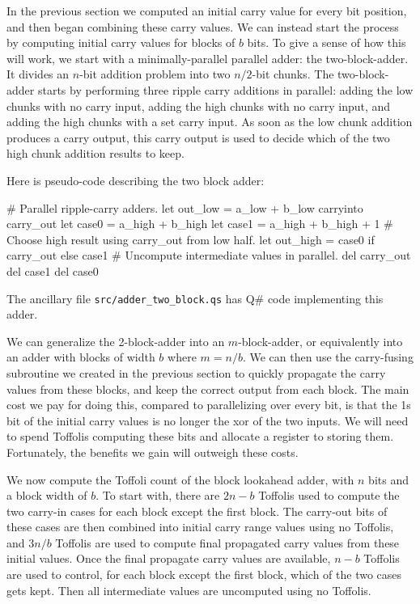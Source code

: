 \documentclass[onecolumn,unpublished]{quantumarticle}
\theoremstyle{definition}
\theoremstyle{definition}
\theoremstyle{definition}
\begin{document}
In the previous section we computed an initial carry value for every bit position, and then began combining these carry values.
We can instead start the process by computing initial carry values for blocks of $b$ bits.
To give a sense of how this will work, we start with a minimally-parallel parallel adder: the two-block-adder.
It divides an $n$-bit addition problem into two $n/2$-bit chunks.
The two-block-adder starts by performing three ripple carry additions in parallel: adding the low chunks with no carry input, adding the high chunks with no carry input, and adding the high chunks with a set carry input.
As soon as the low chunk addition produces a carry output, this carry output is used to decide which of the two high chunk addition results to keep.

Here is pseudo-code describing the two block adder:

\begin{python}
    # Parallel ripple-carry adders.
    let out_low = a_low + b_low carryinto carry_out
    let case0 = a_high + b_high
    let case1 = a_high + b_high + 1
    # Choose high result using carry_out from low half.
    let out_high = case0 if carry_out else case1
    # Uncompute intermediate values in parallel.
    del carry_out
    del case1
    del case0
\end{python}

The ancillary file \texttt{src/adder\_two\_block.qs} has Q\# code implementing this adder.

We can generalize the 2-block-adder into an $m$-block-adder, or equivalently into an adder with blocks of width $b$ where $m=n/b$.
We can then use the carry-fusing subroutine we created in the previous section to quickly propagate the carry values from these blocks, and keep the correct output from each block.
The main cost we pay for doing this, compared to parallelizing over every bit, is that the 1s bit of the initial carry values is no longer the xor of the two inputs.
We will need to spend Toffolis computing these bits and allocate a register to storing them.
Fortunately, the benefits we gain will outweigh these costs.

We now compute the Toffoli count of the block lookahead adder, with $n$ bits and a block width of $b$.
To start with, there are $2n-b$ Toffolis used to compute the two carry-in cases for each block except the first block.
The carry-out bits of these cases are then combined into initial carry range values using no Toffolis, and $3n/b$ Toffolis are used to compute final propagated carry values from these initial values.
Once the final propagate carry values are available, $n-b$ Toffolis are used to control, for each block except the first block, which of the two cases gets kept.
Then all intermediate values are uncomputed using no Toffolis.
\end{document}
